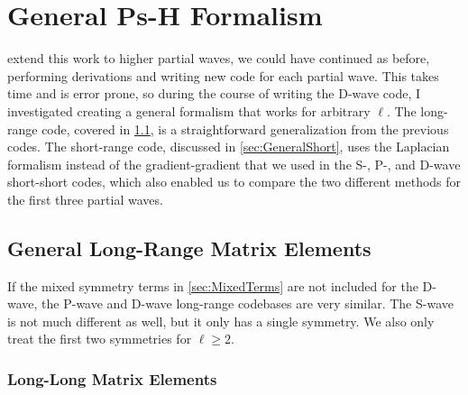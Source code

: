 \documentclass[Dissertation.tex]{subfiles}
\begin{document}
\clearpage
\pagebreak
\newpage

\chapter{General Ps-H Formalism}
\label{chp:General}



\iftoggle{UNT}{To}{\lettrine{\textcolor{startcolor}{T}}{o}}
extend this work to higher partial 
waves, we could have continued as before, performing derivations and writing 
new code for each partial wave. This takes time and is error prone, so during
the course of writing the D-wave code, I investigated creating a general
formalism that works for arbitrary $\ell$. The long-range
code, covered in \cref{sec:GeneralLong}, is a straightforward 
generalization from the previous codes. The short-range code, discussed in 
\cref{sec:GeneralShort}, uses the Laplacian formalism instead of the
gradient-gradient that we used in the S-, P-, and D-wave short-short codes,
which also enabled us to compare the two different methods for the first three
partial waves.



\section{General Long-Range Matrix Elements}
\label{sec:GeneralLong}

If the mixed symmetry terms in \cref{sec:MixedTerms} are not included for the
D-wave, the P-wave and D-wave long-range codebases are very similar. The S-wave 
is not much different as well, but it only has a single symmetry. We also
only treat the first two symmetries for $\ell \geq 2$.

\subsection{Long-Long Matrix Elements}
\label{sec:GeneralLongLong}
\end{document}
